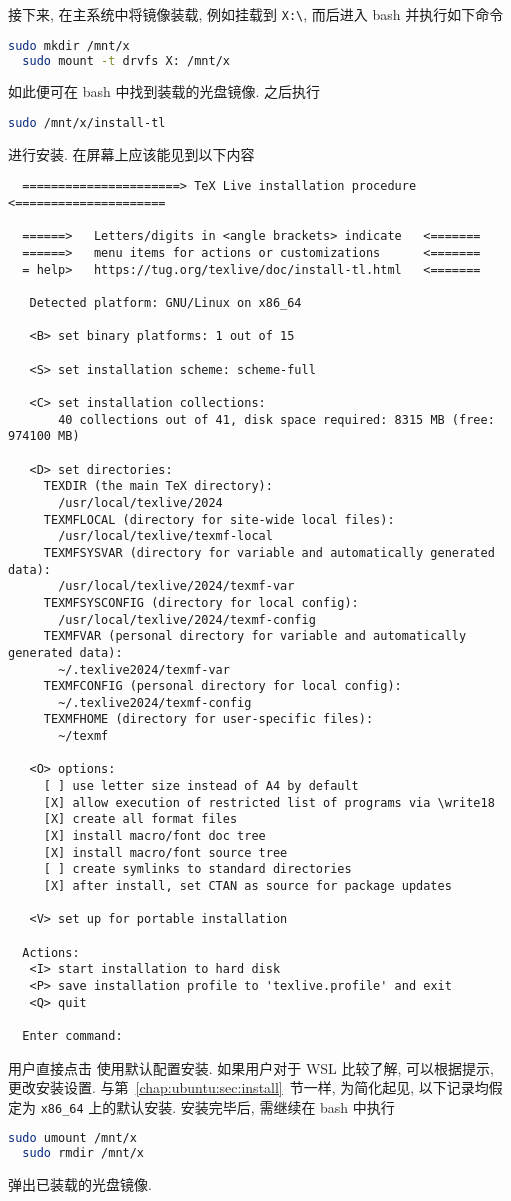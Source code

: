 接下来, 在主系统中将镜像装载,
例如挂载到 \texttt{X:\textbackslash},
而后进入 \textsf{bash} 并执行如下命令
\begin{lstlisting}[language = bash]
  sudo mkdir /mnt/x
  sudo mount -t drvfs X: /mnt/x
\end{lstlisting}
如此便可在 \textsf{bash} 中找到装载的光盘镜像.
之后执行
\begin{lstlisting}[language = bash]
  sudo /mnt/x/install-tl
\end{lstlisting}
进行安装.
在屏幕上应该能见到以下内容
\begin{lstlisting}
  ======================> TeX Live installation procedure <=====================

  ======>   Letters/digits in <angle brackets> indicate   <=======
  ======>   menu items for actions or customizations      <=======
  = help>   https://tug.org/texlive/doc/install-tl.html   <=======
  
   Detected platform: GNU/Linux on x86_64
  
   <B> set binary platforms: 1 out of 15
  
   <S> set installation scheme: scheme-full
  
   <C> set installation collections:
       40 collections out of 41, disk space required: 8315 MB (free: 974100 MB)
  
   <D> set directories:
     TEXDIR (the main TeX directory):
       /usr/local/texlive/2024
     TEXMFLOCAL (directory for site-wide local files):
       /usr/local/texlive/texmf-local
     TEXMFSYSVAR (directory for variable and automatically generated data):
       /usr/local/texlive/2024/texmf-var
     TEXMFSYSCONFIG (directory for local config):
       /usr/local/texlive/2024/texmf-config
     TEXMFVAR (personal directory for variable and automatically generated data):
       ~/.texlive2024/texmf-var
     TEXMFCONFIG (personal directory for local config):
       ~/.texlive2024/texmf-config
     TEXMFHOME (directory for user-specific files):
       ~/texmf
  
   <O> options:
     [ ] use letter size instead of A4 by default
     [X] allow execution of restricted list of programs via \write18
     [X] create all format files
     [X] install macro/font doc tree
     [X] install macro/font source tree
     [ ] create symlinks to standard directories
     [X] after install, set CTAN as source for package updates
  
   <V> set up for portable installation
  
  Actions:
   <I> start installation to hard disk
   <P> save installation profile to 'texlive.profile' and exit
   <Q> quit
  
  Enter command:
\end{lstlisting}
用户直接点击  使用默认配置安装.
如果用户对于 WSL 比较了解, 可以根据提示, 更改安装设置.
与第~\ref{chap:ubuntu:sec:install}~节一样,
为简化起见,
以下记录均假定为 \texttt{x86\_64} 上的默认安装.
安装完毕后, 需继续在 \textsf{bash} 中执行
\begin{lstlisting}[language = bash]
  sudo umount /mnt/x
  sudo rmdir /mnt/x
\end{lstlisting}
弹出已装载的光盘镜像.


